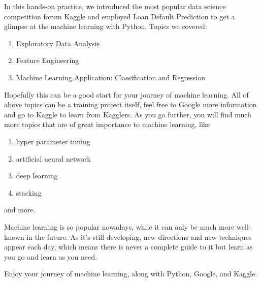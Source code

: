 \documentclass[11pt]{article}
\providecommand{\tightlist}{%
      \setlength{\itemsep}{0pt}\setlength{\parskip}{0pt}}
\begin{document}
In this hands-on practice, we introduced the most popular data science
competition forum Kaggle and employed Loan Default Prediction to get a
glimpse at the machine learning with Python. Topics we covered:

\begin{enumerate}
\def\labelenumi{\arabic{enumi}.}
\tightlist
\item
  Exploratory Data Analysis
\item
  Feature Engineering
\item
  Machine Learning Application: Classification and Regression
\end{enumerate}

Hopefully this can be a good start for your journey of machine learning.
All of above topics can be a training project itself, feel free to
Google more information and go to Kaggle to learn from Kagglers. As you
go further, you will find much more topics that are of great importance
to machine learning, like

\begin{enumerate}
\def\labelenumi{\arabic{enumi}.}
\tightlist
\item
  hyper parameter tuning
\item
  artificial neural network
\item
  deep learning
\item
  stacking
\end{enumerate}

and more.

Machine learning is so popular nowadays, while it can only be much more
well-known in the future. As it's still developing, new directions and
new techniques appear each day, which means there is never a complete
guide to it but learn as you go and learn as you need.

Enjoy your journey of machine learning, along with Python, Google, and
Kaggle.


    
    
    
    
\end{document}
